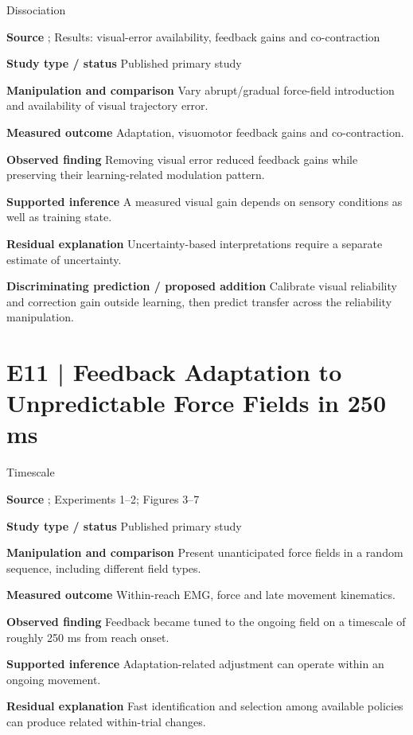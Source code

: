 \documentclass[11pt,a4paper]{article}
\begin{document}
{\small\sffamily\color{navy} Dissociation}\par
\textbf{Source} \cite{franklin2023}; Results: visual-error availability, feedback gains and co-contraction\par
\textbf{Study type / status} Published primary study\par
\textbf{Manipulation and comparison} Vary abrupt/gradual force-field introduction and availability of visual trajectory error.\par
\textbf{Measured outcome} Adaptation, visuomotor feedback gains and co-contraction.\par
\textbf{Observed finding} Removing visual error reduced feedback gains while preserving their learning-related modulation pattern.\par
\textbf{Supported inference} A measured visual gain depends on sensory conditions as well as training state.\par
\textbf{Residual explanation} Uncertainty-based interpretations require a separate estimate of uncertainty.\par
\textbf{Discriminating prediction / proposed addition} Calibrate visual reliability and correction gain outside learning, then predict transfer across the reliability manipulation.\par
\clearpage\section{E11 | Feedback Adaptation to Unpredictable Force Fields in 250 ms}
{\small\sffamily\color{navy} Timescale}\par
\textbf{Source} \cite{crevecoeur2020}; Experiments 1--2; Figures 3--7\par
\textbf{Study type / status} Published primary study\par
\textbf{Manipulation and comparison} Present unanticipated force fields in a random sequence, including different field types.\par
\textbf{Measured outcome} Within-reach EMG, force and late movement kinematics.\par
\textbf{Observed finding} Feedback became tuned to the ongoing field on a timescale of roughly 250 ms from reach onset.\par
\textbf{Supported inference} Adaptation-related adjustment can operate within an ongoing movement.\par
\textbf{Residual explanation} Fast identification and selection among available policies can produce related within-trial changes.\par
\end{document}
